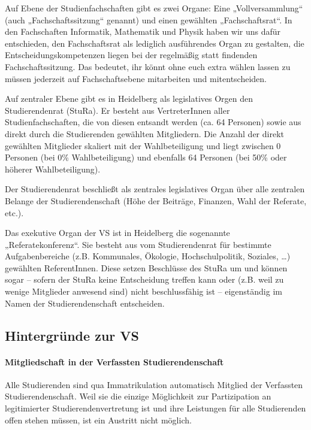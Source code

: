Auf Ebene der Studienfachschaften gibt es zwei Organe: Eine „Vollversammlung“
(auch „Fachschaftssitzung“ genannt) und einen gewählten „Fachschaftsrat“. In
den Fachschaften Informatik, Mathematik und Physik haben wir uns dafür
entschieden, den Fachschaftsrat als lediglich ausführendes Organ zu gestalten,
die Entscheidungskompetenzen liegen bei der regelmäßig statt findenden
Fachschaftssitzung.  Das bedeutet, ihr könnt ohne euch extra wählen lassen zu
müssen jederzeit auf Fachschaftsebene mitarbeiten und mitentscheiden.

Auf zentraler Ebene gibt es in Heidelberg als legislatives Orgen den
Studierendenrat (StuRa).  Er besteht aus VertreterInnen aller
Studienfachschaften, die von diesen entsandt werden (ca. 64 Personen) sowie aus
direkt durch die Studierenden gewählten Mitgliedern.  Die Anzahl der direkt
gewählten Mitglieder skaliert mit der Wahlbeteiligung und liegt zwischen 0
Personen (bei 0\% Wahlbeteiligung) und ebenfalls 64 Personen (bei 50\% oder
höherer Wahlbeteiligung).

Der Studierendenrat beschließt als zentrales legislatives Organ über alle
zentralen Belange der Studierendenschaft (Höhe der Beiträge, Finanzen,
Wahl der Referate, etc.).

Das exekutive Organ der VS ist in Heidelberg die sogenannte
„Referatekonferenz“.  Sie besteht aus vom Studierendenrat für bestimmte
Aufgabenbereiche (z.B.  Kommunales, Ökologie, Hochschulpolitik, Soziales,
\dots) gewählten ReferentInnen. Diese setzen Beschlüsse des StuRa um und können
sogar -- sofern der StuRa keine Entscheidung treffen kann oder (z.B. weil zu
wenige Mitglieder anwesend sind) nicht beschlussfähig ist -- eigenständig im
Namen der Studierendenschaft entscheiden.

\subsection{Hintergründe zur VS}

\paragraph{Mitgliedschaft in der Verfassten Studierendenschaft}

Alle Studierenden sind qua Immatrikulation automatisch Mitglied der Verfassten
Studierendenschaft. Weil sie die einzige Möglichkeit zur Partizipation an
legitimierter Studierendenvertretung ist und ihre Leistungen für alle
Studierenden offen stehen müssen, ist ein Austritt nicht möglich.

